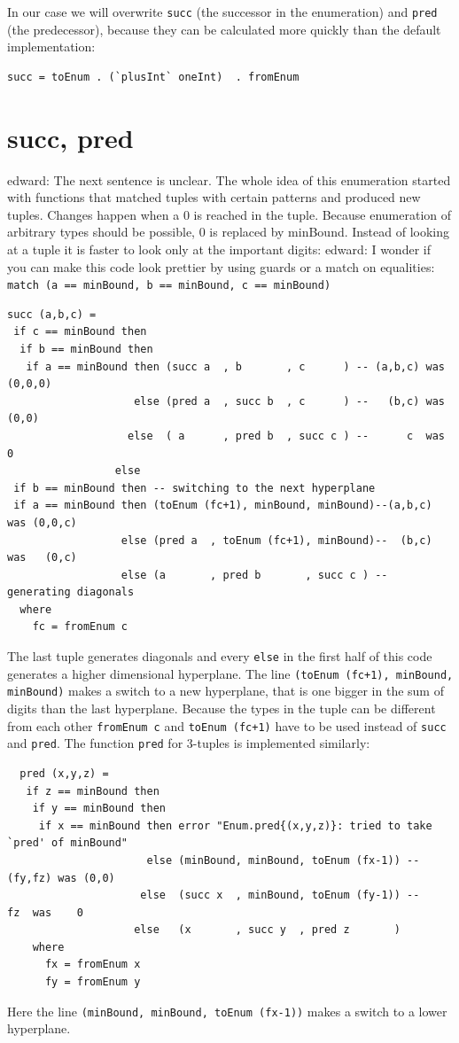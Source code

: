 \documentclass{tmr}
\newcommand{\authornote}[3]{{\color{#2} {\sc #1}: #3}}
\newcommand\bay[1]{\authornote{edward}{blue}{#1}}
\begin{document}
In our case we will overwrite \verb|succ| (the successor in the enumeration) and \verb|pred| (the predecessor), because they can be calculated more quickly than the default implementation:
\begin{Verbatim}
succ = toEnum . (`plusInt` oneInt)  . fromEnum
\end{Verbatim}

\section{succ, pred}
\bay{The next sentence is unclear.} The whole idea of this enumeration started with functions that matched tuples with certain patterns and produced new tuples. Changes happen when a 0 is reached in the tuple. Because enumeration of arbitrary types should be possible, 0 is replaced by minBound. Instead of looking at a tuple it is faster to look only at the important digits: \bay{I wonder if you can make this code look prettier by using guards or a match on equalities: \verb|match (a == minBound, b == minBound, c == minBound)|}
\small
\begin{Verbatim}
succ (a,b,c) =
 if c == minBound then
  if b == minBound then
   if a == minBound then (succ a  , b       , c      ) -- (a,b,c) was (0,0,0)
                    else (pred a  , succ b  , c      ) --   (b,c) was   (0,0)
                   else  ( a      , pred b  , succ c ) --      c  was      0
                 else
 if b == minBound then -- switching to the next hyperplane
 if a == minBound then (toEnum (fc+1), minBound, minBound)--(a,b,c) was (0,0,c)
                  else (pred a  , toEnum (fc+1), minBound)--  (b,c) was   (0,c)
                  else (a       , pred b       , succ c ) -- generating diagonals
  where
    fc = fromEnum c
\end{Verbatim}
The last tuple generates diagonals and every \verb|else| in the first half of this code generates a higher dimensional hyperplane.
The line \verb|(toEnum (fc+1), minBound, minBound)| makes a switch to a new hyperplane, that is one bigger in the sum of digits than the last hyperplane. Because the types in the tuple can be different from each other \verb|fromEnum c| and \verb|toEnum (fc+1)| have to be used instead of \verb|succ| and \verb|pred|. The function \verb|pred| for 3-tuples is implemented similarly:

\begin{Verbatim}
  pred (x,y,z) =
   if z == minBound then
    if y == minBound then
     if x == minBound then error "Enum.pred{(x,y,z)}: tried to take `pred' of minBound"
                      else (minBound, minBound, toEnum (fx-1)) -- (fy,fz) was (0,0)
                     else  (succ x  , minBound, toEnum (fy-1)) --     fz  was    0
                    else   (x       , succ y  , pred z       )
    where
      fx = fromEnum x
      fy = fromEnum y
\end{Verbatim}
Here the line \verb|(minBound, minBound, toEnum (fx-1))| makes a switch to a lower hyperplane.
\end{document}
